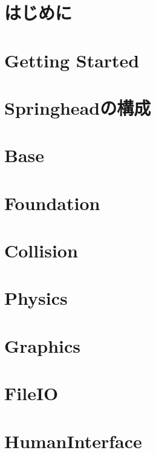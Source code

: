 \chapter{はじめに}
\label{chap_intro}


\chapter{Getting Started}
\label{chap_getstarted}
%

\chapter{Springheadの構成}
\label{chap_structure}
%

\chapter{Base}
\label{chap_base}
%

\chapter{Foundation}
\label{chap_foundation}
%

\chapter{Collision}
\label{chap_collision}
%

\chapter{Physics}
\label{chap_physics}
%

\chapter{Graphics}
\label{chap_graphics}
%

\chapter{FileIO}
\label{chap_fileio}
%

\chapter{HumanInterface}
\label{chap_humaninterface}
%

